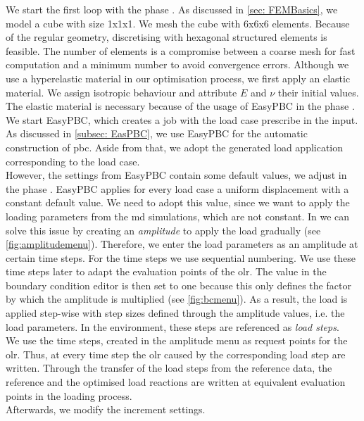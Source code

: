We start the first loop with the phase . As discussed in \autoref{sec: FEMBasics}, we model a cube with size 1x1x1. We mesh the cube with 6x6x6 elements. Because of the regular geometry, discretising with hexagonal structured elements is feasible.
The number of elements is a compromise between a coarse mesh for fast computation and a minimum number to avoid convergence errors.
Although we use a hyperelastic material in our optimisation process, we first apply an elastic material.
We assign isotropic behaviour and attribute $E$ and $\nu$ their initial values. \\
\indent The elastic material is necessary because of the usage of EasyPBC in the phase .
We start EasyPBC, which creates a job with the load case prescribe in the input.
As discussed in \autoref{subsec: EasPBC}, we use EasyPBC for the automatic construction of \acrshort{pbc}. Aside from that, we adopt the generated load application corresponding to the load case. \\
\indent However, the settings from EasyPBC contain some default values, we adjust in the phase . EasyPBC applies for every load case a uniform displacement with a constant default value.
We need to adopt this value, since we want to apply the loading parameters from the \acrshort{md} simulations, which are not constant.
In  we can solve this issue by creating an \emph{amplitude} to apply the load gradually (see \autoref{fig:amplitudemenu}).
Therefore, we enter the load parameters as an amplitude at certain time steps.
For the time steps we use sequential numbering. We use these time steps later to adapt the evaluation points of the \acrlong{olr}.
The value in the boundary condition editor is then set to one because this only defines the factor by which the amplitude is multiplied (see \autoref{fig:bcmenu}).
As a result, the load is applied step-wise with step sizes defined through the amplitude values, i.e. the load parameters. 
In the  environment, these steps are referenced as \emph{load steps}.\\
\indent We use the time steps, created in the amplitude menu as request points for the \acrlong{olr}.
Thus, at every time step the \acrlong{olr} caused by the corresponding load step are written. 
Through the transfer of the load steps from the reference data, the reference and the optimised load reactions are written at equivalent evaluation points in the loading process.\\
\indent Afterwards, we modify the increment settings.

